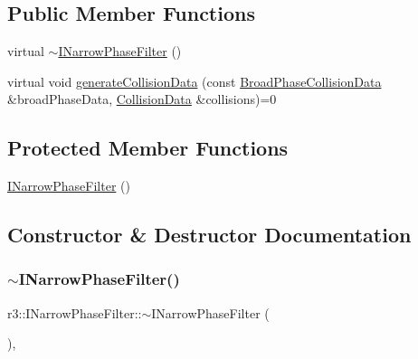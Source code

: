 \subsection*{Public Member Functions}
\begin{DoxyCompactItemize}
\item 
virtual \mbox{\hyperlink{classr3_1_1_i_narrow_phase_filter_a87d190166b99b0ace5e6005d9e62562b}{$\sim$\+I\+Narrow\+Phase\+Filter}} ()
\item 
virtual void \mbox{\hyperlink{classr3_1_1_i_narrow_phase_filter_a32ae92d18c929adfc5af54449c069d3b}{generate\+Collision\+Data}} (const \mbox{\hyperlink{classr3_1_1_broad_phase_collision_data}{Broad\+Phase\+Collision\+Data}} \&broad\+Phase\+Data, \mbox{\hyperlink{classr3_1_1_collision_data}{Collision\+Data}} \&collisions)=0
\end{DoxyCompactItemize}
\subsection*{Protected Member Functions}
\begin{DoxyCompactItemize}
\item 
\mbox{\hyperlink{classr3_1_1_i_narrow_phase_filter_a48c0812ce04a7e258c8fbbf34c8b85a6}{I\+Narrow\+Phase\+Filter}} ()
\end{DoxyCompactItemize}


\subsection{Constructor \& Destructor Documentation}
\mbox{\label{classr3_1_1_i_narrow_phase_filter_a87d190166b99b0ace5e6005d9e62562b}} 
\subsubsection{\texorpdfstring{$\sim$\+I\+Narrow\+Phase\+Filter()}{~INarrowPhaseFilter()}}
{\footnotesize\ttfamily r3\+::\+I\+Narrow\+Phase\+Filter\+::$\sim$\+I\+Narrow\+Phase\+Filter (\begin{DoxyParamCaption}{ }\end{DoxyParamCaption})\hspace{0.3cm}{\ttfamily [virtual]}, {\ttfamily [default]}}

